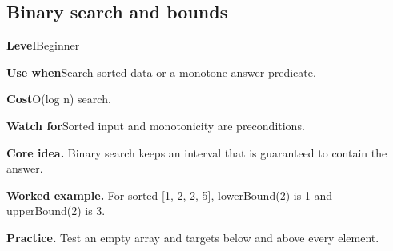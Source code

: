 \documentclass[10pt,letterpaper]{article}
\newcommand{\entrylabel}[1]{\textcolor{accent}{\bfseries #1}}
\begin{document}
\subsection{Binary search and bounds}
\begin{guidebox}\small
\entrylabel{Level}\quad Beginner\par
\entrylabel{Use when}\quad Search sorted data or a monotone answer predicate.\par
\entrylabel{Cost}\quad O(log n) search.\par
\entrylabel{Watch for}\quad Sorted input and monotonicity are preconditions.\par
\end{guidebox}
\noindent\textbf{Core idea.} Binary search keeps an interval that is guaranteed to contain the answer.\par
\noindent\textbf{Worked example.} For sorted [1, 2, 2, 5], lowerBound(2) is 1 and upperBound(2) is 3.\par
\noindent\textbf{Practice.} Test an empty array and targets below and above every element.\par
\end{document}
